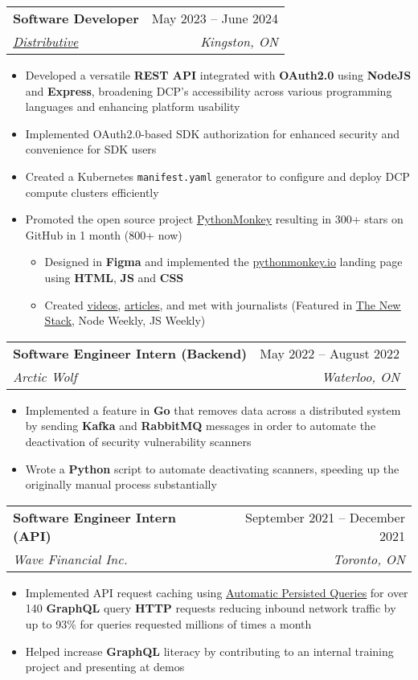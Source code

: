 \documentclass[letterpaper,11pt]{article}
\makeatletter
\newcommand{\resumeItem}[1]{
  \item\small{
    {#1 \vspace{-2pt}}
  }
}
\newcommand{\resumeSubheading}[4]{
  \vspace{-2pt}\item
    \begin{tabular*}{0.97\textwidth}[t]{l@{\extracolsep{\fill}}r}
      \textbf{#1} & #2 \\
      \textit{\small#3} & \textit{\small #4} \\
    \end{tabular*}\vspace{-7pt}
}
\newcommand{\resumeItemListStart}{\begin{itemize}}
\newcommand{\resumeItemListEnd}{\end{itemize}\vspace{-5pt}}
\makeatother
\begin{document}
    \resumeSubheading
      {Software Developer}{May 2023 -- June 2024}
      {\href{https://distributive.network/}{\underline{Distributive}}}{Kingston, ON}
      \resumeItemListStart 
        \resumeItem{Developed a versatile \textbf{REST API} integrated with \textbf{OAuth2.0} using \textbf{NodeJS} and \textbf{Express}, broadening DCP's accessibility across various programming languages and enhancing platform usability}
        \resumeItem{Implemented OAuth2.0-based SDK authorization for enhanced security and convenience for SDK users}
        \resumeItem{Created a Kubernetes \texttt{manifest.yaml} generator to configure and deploy DCP compute clusters efficiently}
        \resumeItem{Promoted the open source project \href{https://github.com/Distributive-Network/PythonMonkey}{\underline{PythonMonkey}} resulting in 300+ stars on GitHub in 1 month (800+ now)}
      	\resumeItemListStart 
        	\resumeItem{Designed in \textbf{Figma} and implemented the \href{https://pythonmonkey.io/}{\underline{pythonmonkey.io}} landing page using \textbf{HTML}, \textbf{JS} and \textbf{CSS}}
        	\resumeItem{Created \href{https://youtu.be/UmlSryXsh30}{\underline{videos}}, \href{https://distributive.network/jobs/python-monkey}{\underline{articles}}, and met with journalists (Featured in \href{https://thenewstack.io/python-meets-javascript-wasm-with-the-magic-of-pythonmonkey/}{\underline{The New Stack}}, Node Weekly, JS Weekly)}
      	\resumeItemListEnd
      \resumeItemListEnd

    \resumeSubheading
      {Software Engineer Intern (Backend)}{May 2022 -- August 2022}
      {Arctic Wolf}{Waterloo, ON}
      \resumeItemListStart 
        \resumeItem{Implemented a feature in \textbf{Go} that removes data across a distributed system by sending \textbf{Kafka} and \textbf{RabbitMQ} messages in order to automate the deactivation of security vulnerability scanners}
        \resumeItem{Wrote a \textbf{Python} script to automate deactivating scanners, speeding up the originally manual process substantially}
      \resumeItemListEnd


    \resumeSubheading
      {Software Engineer Intern (API)}{September 2021 -- December 2021}
      {Wave Financial Inc.}{Toronto, ON}
      \resumeItemListStart 
        \resumeItem{Implemented API request caching using \href{https://www.apollographql.com/docs/apollo-server/performance/apq/}{\underline{Automatic Persisted Queries}} for over 140 \textbf{GraphQL} query \textbf{HTTP} requests reducing inbound network traffic by up to 93\% for queries requested millions of times a month}
        \resumeItem{Helped increase \textbf{GraphQL} literacy by contributing to an internal training project and presenting at demos}
      \resumeItemListEnd
    
\end{document}
